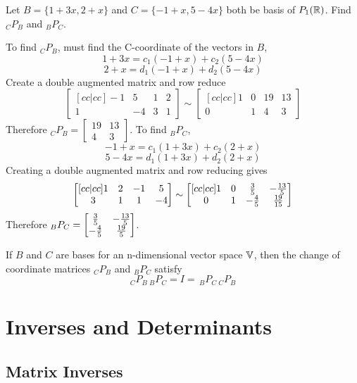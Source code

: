 \documentclass[english, 12pt]{article}
\begin{document}
\begin{exmp}
Let $B = \{1 + 3x,2+x\}$ and $C = \{-1+x,5-4x\}$ both be basis of $P_1({\mathbb{R}})$. Find $_CP_B$ and $_BP_C$.

\begin{sol}
To find $_CP_B$, must find the C-coordinate of the vectors in $B$,
\[1 + 3x = c_1 (-1 + x) + c_2 (5-4x)\]
\[2+x = d_1(-1+x) + d_2(5-4x)\]
Create a double augmented matrix and row reduce
\[\begin{bmatrix}[cc|cc] -1 & 5 & 1 & 2 \\ 1 & -4 & 3 & 1 \end{bmatrix} \sim \begin{bmatrix}[cc|cc] 1 & 0 & 19 & 13 \\ 0 & 1 & 4 & 3 \end{bmatrix}\]
Therefore $_CP_B = \begin{bmatrix} 19 & 13 \\ 4 & 3 \end{bmatrix}$. To find $_BP_C$,
\[-1 + x = c_1 (1 + 3x) + c_2 (2 + x)\]
\[5 - 4x = d_1(1+3x) + d_2 (2+x)\]
Creating a double augmented matrix and row reducing gives
\[\begin{bmatrix}[cc|cc] 1 & 2 & -1 & 5 \\ 3 & 1 & 1 & -4 \end{bmatrix} \sim \begin{bmatrix}[cc|cc] 1 & 0 & \frac{3}{5} & - \frac{13}{5} \\ 0 & 1 & - \frac{4}{5} & \frac{19}{15} \end{bmatrix}\]
Therefore $_BP_C = \begin{bmatrix} \frac{3}{5} & -\frac{13}{5} \\ - \frac{4}{5} & \frac{19}{5} \end{bmatrix}$.
\end{sol}
\end{exmp}

\begin{thrm}
If $B$ and $C$ are bases for an n-dimensional vector space ${\mathbb{V}}$, then the change of coordinate matrices $_CP_B$ and $_BP_C$ satisfy
\[_CP_B\,_BP_C = I = \,_BP_C\,_CP_B\]
\end{thrm}

\section{Inverses and Determinants}

\subsection{Matrix Inverses}
\end{document}
